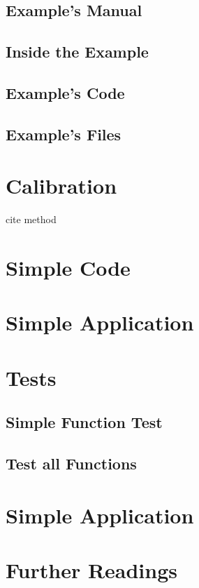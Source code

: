 \subsection{Example's Manual}

\subsection{Inside the Example}

\subsection{Example's Code}

\subsection{Example's Files}



\section{Calibration}

cite method

\section{Simple Code}


\section{Simple Application}



\section{Tests}

\subsection{Simple Function Test}

\subsection{Test all Functions}

\section{Simple Application}


\section{Further Readings}

